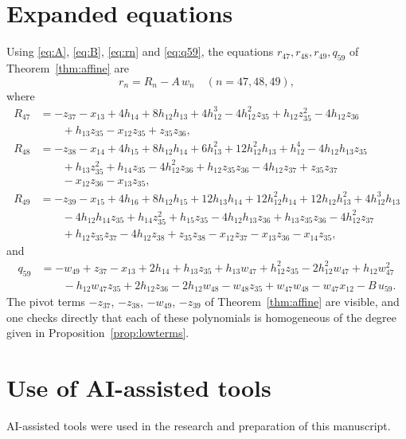 \documentclass{amsart}
\theoremstyle{definition}
\theoremstyle{remark}
\numberwithin{equation}{section}
\begin{document}
\clearpage
\appendix

\section{Expanded equations}\label{app:formulas}

Using \eqref{eq:A}, \eqref{eq:B}, \eqref{eq:rn} and \eqref{eq:q59}, the equations $r_{47},r_{48},r_{49},q_{59}$ of Theorem~\ref{thm:affine} are
\[
r_n=R_n-A\,w_n\quad(n=47,48,49),
\]
where
\begin{align*}
R_{47}&=-z_{37}-x_{13}+4h_{14}+8h_{12}h_{13}+4h_{12}^3-4h_{12}^2z_{35}+h_{12}z_{35}^2-4h_{12}z_{36}\\
&\qquad+h_{13}z_{35}-x_{12}z_{35}+z_{35}z_{36},\\[2pt]
R_{48}&=-z_{38}-x_{14}+4h_{15}+8h_{12}h_{14}+6h_{13}^2+12h_{12}^2h_{13}+h_{12}^4-4h_{12}h_{13}z_{35}\\
&\qquad+h_{13}z_{35}^2+h_{14}z_{35}-4h_{12}^2z_{36}+h_{12}z_{35}z_{36}-4h_{12}z_{37}+z_{35}z_{37}\\
&\qquad-x_{12}z_{36}-x_{13}z_{35},\\[2pt]
R_{49}&=-z_{39}-x_{15}+4h_{16}+8h_{12}h_{15}+12h_{13}h_{14}+12h_{12}^2h_{14}+12h_{12}h_{13}^2+4h_{12}^3h_{13}\\
&\qquad-4h_{12}h_{14}z_{35}+h_{14}z_{35}^2+h_{15}z_{35}-4h_{12}h_{13}z_{36}+h_{13}z_{35}z_{36}-4h_{12}^2z_{37}\\
&\qquad+h_{12}z_{35}z_{37}-4h_{12}z_{38}+z_{35}z_{38}-x_{12}z_{37}-x_{13}z_{36}-x_{14}z_{35},
\end{align*}
and
\begin{align*}
q_{59}&=-w_{49}+z_{37}-x_{13}+2h_{14}+h_{13}z_{35}+h_{13}w_{47}+h_{12}^2z_{35}-2h_{12}^2w_{47}+h_{12}w_{47}^2\\
&\qquad-h_{12}w_{47}z_{35}+2h_{12}z_{36}-2h_{12}w_{48}-w_{48}z_{35}+w_{47}w_{48}-w_{47}x_{12}-B\,u_{59}.
\end{align*}
The pivot terms $-z_{37}$, $-z_{38}$, $-w_{49}$, $-z_{39}$ of Theorem~\ref{thm:affine} are visible, and one checks directly that each of these polynomials is homogeneous of the degree given in Proposition~\ref{prop:lowterms}.

\section*{Use of AI-assisted tools}
AI-assisted tools were used in the research and preparation of this manuscript.
\end{document}
